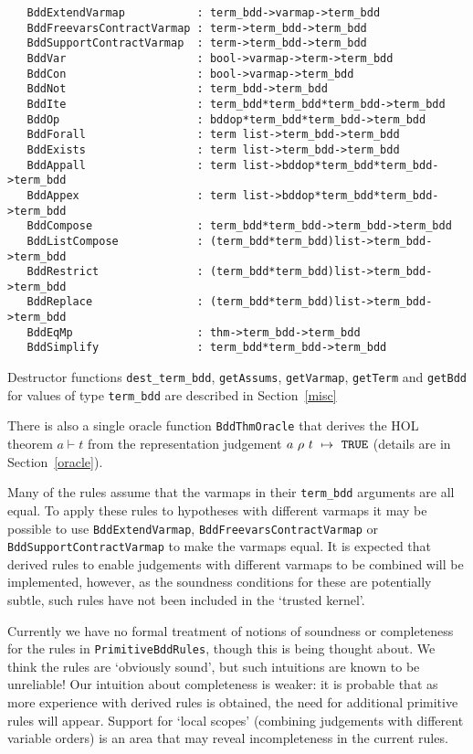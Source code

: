 \documentclass[12pt]{article}
\renewcommand{\t}[1]{\mbox{\tt #1}}
\newcommand{\ml}[1]{{\tt #1}}
\newcommand{\termbdd}[4]{\mbox{$#1~#2~#3~\mapsto~#4$}}
\newcommand\termbddty{\texttt{term\_bdd}\xspace}
\begin{document}
{\footnotesize\begin{verbatim}
   BddExtendVarmap           : term_bdd->varmap->term_bdd
   BddFreevarsContractVarmap : term->term_bdd->term_bdd
   BddSupportContractVarmap  : term->term_bdd->term_bdd
   BddVar                    : bool->varmap->term->term_bdd
   BddCon                    : bool->varmap->term_bdd
   BddNot                    : term_bdd->term_bdd
   BddIte                    : term_bdd*term_bdd*term_bdd->term_bdd
   BddOp                     : bddop*term_bdd*term_bdd->term_bdd
   BddForall                 : term list->term_bdd->term_bdd
   BddExists                 : term list->term_bdd->term_bdd
   BddAppall                 : term list->bddop*term_bdd*term_bdd->term_bdd
   BddAppex                  : term list->bddop*term_bdd*term_bdd->term_bdd
   BddCompose                : term_bdd*term_bdd->term_bdd->term_bdd
   BddListCompose            : (term_bdd*term_bdd)list->term_bdd->term_bdd
   BddRestrict               : (term_bdd*term_bdd)list->term_bdd->term_bdd
   BddReplace                : (term_bdd*term_bdd)list->term_bdd->term_bdd
   BddEqMp                   : thm->term_bdd->term_bdd
   BddSimplify               : term_bdd*term_bdd->term_bdd
\end{verbatim}}

Destructor functions \t{dest\_term\_bdd}, \t{getAssums}, \t{getVarmap}, \t{getTerm}
and \t{getBdd} for values of type \termbddty are described in Section~\ref{misc}

There is also a single oracle function
\t{BddThmOracle} that derives the HOL theorem $a \vdash t$
from the representation judgement \termbdd{a}{\rho}{t}{\ml{TRUE}}
(details are in Section~\ref{oracle}).

Many of the rules assume that the varmaps in their \termbddty
arguments are all equal. To apply these rules to hypotheses with
different varmaps it may be possible to use \t{BddExtendVarmap},
\t{BddFreevarsContractVarmap} or \t{BddSupportContractVarmap} to make
the varmaps equal.  It is expected that derived rules to enable
judgements with different varmaps to be combined will be implemented,
however, as the soundness conditions for these are potentially subtle,
such rules have not been included in the `trusted kernel'.

Currently we have no formal treatment of notions of soundness or
completeness for the rules in \t{PrimitiveBddRules}, though this is
being thought about. We think the rules are `obviously sound', but
such intuitions are known to be unreliable! Our intuition about
completeness is weaker: it is probable that as more experience with
derived rules is obtained, the need for additional primitive rules
will appear. Support for `local scopes' (combining judgements with
different variable orders) is an area that may reveal incompleteness
in the current rules.
\end{document}

